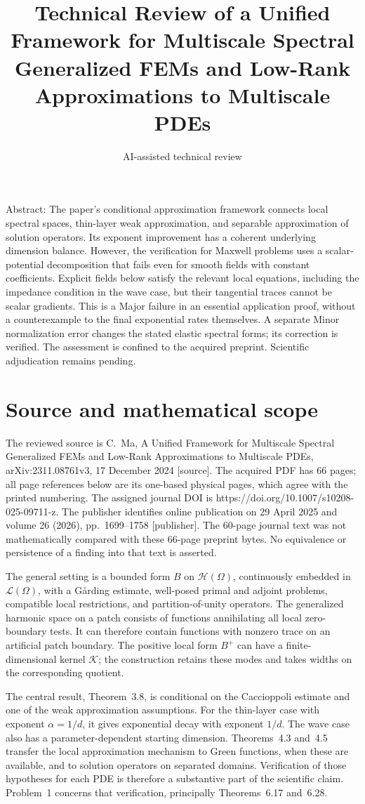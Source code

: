 \documentclass[10pt]{article}
\title{Technical Review of a Unified Framework for
Multiscale Spectral Generalized FEMs and
Low-Rank Approximations to Multiscale PDEs}
\author{AI-assisted technical review}
\date{}
\begin{document}
\maketitle
Abstract: The paper’s conditional approximation framework connects local spectral spaces, thin-layer weak approximation, and separable approximation of solution operators. Its exponent improvement has a coherent underlying dimension balance. However, the verification for Maxwell problems uses a scalar-potential decomposition that fails even for smooth fields with constant coefficients. Explicit fields below satisfy the relevant local equations, including the impedance condition in the wave case, but their tangential traces cannot be scalar gradients. This is a Major failure in an essential application proof, without a counterexample to the final exponential rates themselves. A separate Minor normalization error changes the stated elastic spectral forms; its correction is verified. The assessment is confined to the acquired preprint. Scientific adjudication remains pending.\par
\section*{Source and mathematical scope}
The reviewed source is C. Ma, A Unified Framework for Multiscale Spectral Generalized FEMs and Low-Rank Approximations to Multiscale PDEs, arXiv:2311.08761v3, 17 December 2024 [source]. The acquired PDF has 66 pages; all page references below are its one-based physical pages, which agree with the printed numbering. The assigned journal DOI is https://doi.org/10.1007/s10208-025-09711-z. The publisher identifies online publication on 29 April 2025 and volume 26 (2026), pp. 1699–1758 [publisher]. The 60-page journal text was not mathematically compared with these 66-page preprint bytes. No equivalence or persistence of a finding into that text is asserted.\par
The general setting is a bounded form \(B\) on \(\mathcal H(\Omega)\), continuously embedded in \(\mathcal L(\Omega)\), with a Gårding estimate, well-posed primal and adjoint problems, compatible local restrictions, and partition-of-unity operators. The generalized harmonic space on a patch consists of functions annihilating all local zero-boundary tests. It can therefore contain functions with nonzero trace on an artificial patch boundary. The positive local form \(B^+\) can have a finite-dimensional kernel \(\mathcal K\); the construction retains these modes and takes widths on the corresponding quotient.\par
The central result, Theorem 3.8, is conditional on the Caccioppoli estimate and one of the weak approximation assumptions. For the thin-layer case with exponent \(\alpha=1/d\), it gives exponential decay with exponent \(1/d\). The wave case also has a parameter-dependent starting dimension. Theorems 4.3 and 4.5 transfer the local approximation mechanism to Green functions, when these are available, and to solution operators on separated domains. Verification of those hypotheses for each PDE is therefore a substantive part of the scientific claim. Problem 1 concerns that verification, principally Theorems 6.17 and 6.28.\par
\end{document}
